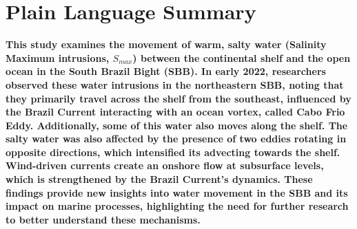 \documentclass[draft]{agujournal2019}
\begin{document}
%
%

\begin{abstract}
\textbf{Cross-shelf exchanges play a crucial role in distributing heat, salt, pollutants, and biogeochemical properties between the continental shelf and the open ocean. Among the processes shaping these exchanges, the intrusion of salty and warm waters (mid-depth Salinity Maximum, \textit{$S_{max}$}) remains poorly understood in the South Brazil Bight (SBB). Here, we present observational evidence of \textit{$S_{max}$} intrusions in the Northeast SBB (NE-SBB) from independent measurements between February and March 2022. Using a multi-platform observational dataset, we propose the events observed in March 2022 were advected from north by the Brazil Current (BC) and the BC meander interacting with the cyclonic Cabo Frio Eddy drove the cross-shelf pathways, thus advecting \textit{$S_{max}$} directly to the NE-SBB. We also found an additional southwestward along-shelf pathway, resembling the non-meandering BC, directly advecting \textit{$S_{max}$} from their source region. In both cases, once \textit{$S_{max}$} reached the shelf break, Burger number (Bu) analysis revealed an onshore counterflow at mid-depths (Bu $>$ 1), driven by wind-induced circulation and reinforced by mesoscale dynamics. These findings highlight the role of the Cabo Frio Eddy in connecting offshore waters to the shelf and emphasize the importance of remote intrusions in shaping the thermodynamics and biogeochemistry of the SBB.}
\end{abstract}

\section*{Plain Language Summary}
\textbf{This study examines the movement of warm, salty water (Salinity Maximum intrusions, \textit{$S_{max}$}) between the continental shelf and the open ocean in the South Brazil Bight (SBB). In early 2022, researchers observed these water intrusions in the northeastern SBB, noting that they primarily travel across the shelf from the southeast, influenced by the Brazil Current interacting with an ocean vortex, called Cabo Frio Eddy. Additionally, some of this water also moves along the shelf. The salty water was also affected by the presence of two eddies rotating in opposite directions, which intensified its advecting towards the shelf. Wind-driven currents create an onshore flow at subsurface levels, which is strengthened by the Brazil Current's dynamics. These findings provide new insights into water movement in the SBB and its impact on marine processes, highlighting the need for further research to better understand these mechanisms.}
\end{document}
